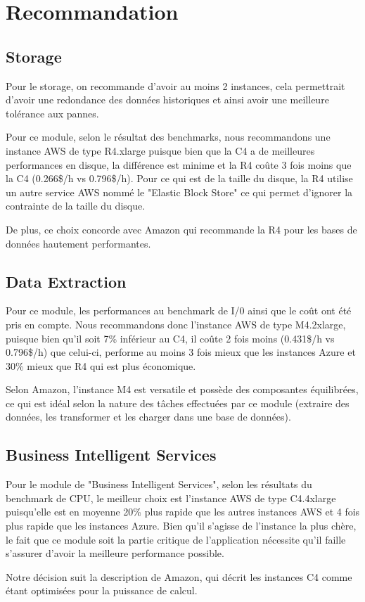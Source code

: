 \section{Recommandation}

\subsection{Storage}

Pour le storage, on recommande d'avoir au moins 2 instances, cela permettrait d'avoir une redondance des données historiques et ainsi avoir une meilleure tolérance aux pannes. 

Pour ce module, selon le résultat des benchmarks, nous recommandons une instance AWS de type R4.xlarge puisque bien que la C4 a de meilleures performances en disque, la différence est minime et la R4 coûte 3 fois moins que la C4 (0.266\$/h vs 0.796\$/h). Pour ce qui est de la taille du disque, la R4 utilise un autre service AWS nommé le "Elastic Block Store" ce qui permet d'ignorer la contrainte de la taille du disque. \newline

De plus, ce choix concorde avec Amazon qui recommande la R4 pour les bases de données hautement performantes.

\subsection{Data Extraction}

Pour ce module, les performances au benchmark de I/0 ainsi que le coût ont été pris en compte. Nous recommandons donc l'instance AWS de type M4.2xlarge, puisque bien qu'il soit 7\% inférieur au C4, il coûte 2 fois moins (0.431\$/h vs 0.796\$/h) que celui-ci, performe au moins 3 fois mieux que les instances Azure et 30\% mieux que R4 qui est plus économique.\newline 

Selon Amazon, l'instance M4 est versatile et possède des composantes équilibrées, ce qui est idéal selon la nature des tâches effectuées par ce module (extraire des données, les transformer et les charger dans une base de données). 

\subsection{Business Intelligent Services}

Pour le module de "Business Intelligent Services", selon les résultats du benchmark de CPU, le meilleur choix est l'instance AWS de type C4.4xlarge puisqu'elle est en moyenne 20\% plus rapide que les autres instances AWS et 4 fois plus rapide que les instances Azure. Bien qu'il s'agisse de l'instance la plus chère, le fait que ce module soit la partie critique de l'application nécessite qu'il faille s'assurer d'avoir la meilleure performance possible. \newline

Notre décision suit la description de Amazon, qui décrit les instances C4 comme étant optimisées pour la puissance de calcul.


